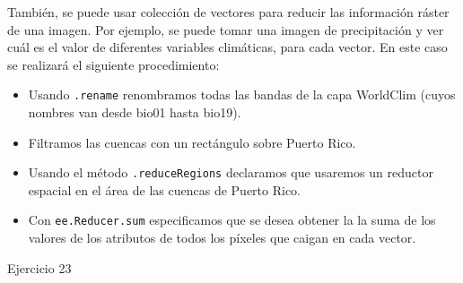 \documentclass[
  12pt,
  letterpaper,
  twoside]{book}
\providecommand{\tightlist}{%
  \setlength{\itemsep}{0pt}\setlength{\parskip}{0pt}}
\begin{document}
También, se puede usar colección de vectores para reducir las información ráster de una imagen. Por ejemplo, se puede tomar una imagen de precipitación y ver cuál es el valor de diferentes variables climáticas, para cada vector. En este caso se realizará el siguiente procedimiento:

\begin{itemize}
\tightlist
\item
  Usando \texttt{.rename} renombramos todas las bandas de la capa WorldClim (cuyos nombres van desde bio01 hasta bio19).
\item
  Filtramos las cuencas con un rectángulo sobre Puerto Rico.
\item
  Usando el método \texttt{.reduceRegions} declaramos que usaremos un reductor espacial en el área de las cuencas de Puerto Rico.
\item
  Con \texttt{ee.Reducer.sum} especificamos que se desea obtener la la suma de los valores de los atributos de todos los píxeles que caigan en cada vector.
\end{itemize}

Ejercicio 23
\end{document}
